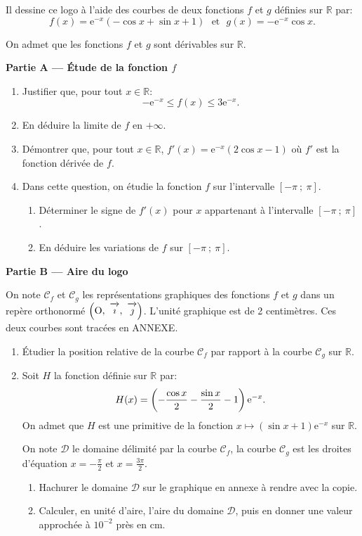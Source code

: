 \documentclass[10pt,a4paper]{article}
\newcommand{\R}{\mathbb{R}}
\def\e{\text{e}}
\newcommand{\vect}[1]{\overrightarrow{\,\mathstrut#1\,}}
\def\Oij{$\left(\text{O},~\vect{\imath},~\vect{\jmath}\right)$}
\begin{document}
Il dessine ce logo à l'aide des courbes de deux fonctions $f$ et $g$ définies sur $\R$ par:
\[
f(x)=\e^{-x}(-\cos x+\sin x+1)\text{~~et~~}
g(x)=-\e^{-x}\cos x.
\]

On admet que les fonctions $f$ et $g$ sont dérivables sur $\R$.

\medskip
 
\textbf{Partie A — Étude de la fonction $f$}

\medskip

\begin{enumerate}
\item Justifier que, pour tout $x\in\R$:\[
-\e^{-x}\leqslant f(x)\leqslant 3\e^{-x}.\]
\item En déduire la limite de $f$ en $+\infty$.
\item Démontrer que, pour tout $x\in\R$, $f'(x)=\e^{-x}(2\cos x-1)$ où $f'$ est la fonction dérivée de $f$.
\item Dans cette question, on étudie la fonction $f$ sur l'intervalle $[-\pi~;~\pi]$.
	\begin{enumerate}
		\item Déterminer le signe de $f'(x)$ pour $x$ appartenant à l'intervalle $[-\pi~;~\pi]$.
		\item En déduire les variations de $f$ sur $[-\pi~;~\pi]$.
	\end{enumerate}
\end{enumerate}

\medskip

\textbf{Partie B — Aire du logo}

\smallskip

On note $\mathcal{C}_f$ et $\mathcal{C}_g$ les représentations graphiques des fonctions $f$ et $g$ dans un repère orthonormé \Oij. L'unité graphique est de 2 centimètres. Ces deux courbes sont tracées en ANNEXE.

\medskip

\begin{enumerate}
\item Étudier la position relative de la courbe $\mathcal{C}_f$ par rapport à la courbe $\mathcal{C}_g$ sur $\R$.
\item Soit $H$ la fonction définie sur $\R$ par:
\[
H(x)=\left(-\frac{\cos x}{2}-\frac{\sin x}{2}-1\right)\e^{-x}.\index{fonction exponentielle}
\]
On admet que $H$ est une primitive de la fonction $x\mapsto (\sin x+1)\e^{-x}$ sur $\R$.

On note $\mathcal{D}$ le domaine délimité par la courbe $\mathcal{C}_f$, la courbe $\mathcal{C}_g$ est les droites d'équation $x=-\frac{\pi}{2}$ et $x=\frac{3\pi}{2}$.
	\begin{enumerate}
		\item Hachurer le domaine $\mathcal{D}$ sur le graphique en annexe à rendre avec la copie.
		\item Calculer, en unité d'aire, l'aire du domaine $\mathcal{D}$, puis en donner une valeur approchée à $10^{-2}$ près en cm.
	\end{enumerate}
\end{enumerate}
\end{document}
